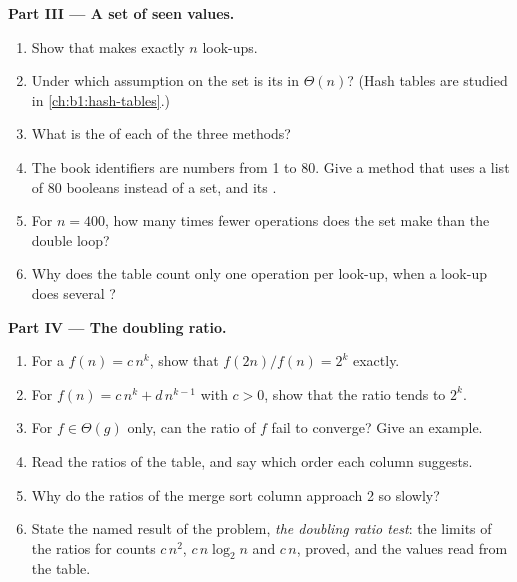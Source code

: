 \begin{problem}
\medskip\noindent\textbf{Part III --- A set of seen values.}
\begin{enumerate}[resume]
\item Show that  makes exactly $n$ look-ups.
\item Under which assumption on the set is its  in $\Theta(n)$? (Hash tables are studied in
\cref{ch:b1:hash-tables}.)
\item What is the  of each of the three methods?
\item The book identifiers are numbers from 1 to 80. Give a method that uses a list of 80 booleans instead of a set, and
its .
\item For $n = 400$, how many times fewer operations does the set make than the double loop?
\item Why does the table count only one operation per look-up, when a look-up does several ?
\end{enumerate}

\medskip\noindent\textbf{Part IV --- The doubling ratio.}
\begin{enumerate}[resume]
\item For a  $f(n) = c\,n^k$, show that $f(2n)/f(n) = 2^k$ exactly.
\item For $f(n) = c\, n^k + d\,n^{k - 1}$ with $c > 0$, show that the ratio tends to $2^k$.
\item For $f \in \Theta(g)$ only, can the ratio of $f$ fail to converge? Give an example.
\item Read the ratios of the table, and say which order each column suggests.
\item Why do the ratios of the merge sort column approach 2 so slowly?
\item State the named result of the problem, \emph{the doubling ratio test}: the limits of the ratios for counts
$c\,n^2$, $c\,n \log_2 n$ and $c\,n$, proved, and the values read from the table.
\end{enumerate}
\end{problem}
